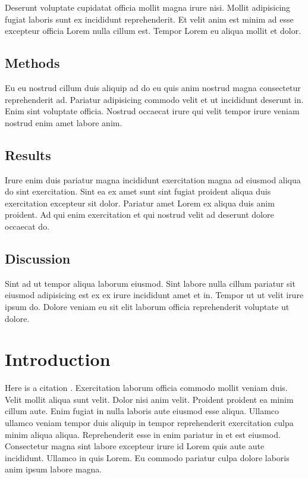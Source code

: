 \documentclass[
  super,
  preprint,
  3p]{elsarticle}
\begin{document}
Deserunt voluptate cupidatat officia mollit magna irure nisi. Mollit
adipisicing fugiat laboris sunt ex incididunt reprehenderit. Et velit
anim est minim ad esse excepteur officia Lorem nulla cillum est. Tempor
Lorem eu aliqua mollit et dolor.

\hypertarget{methods}{%
\subsection{Methods}\label{methods}}

Eu eu nostrud cillum duis aliquip ad do eu quis anim nostrud magna
consectetur reprehenderit ad. Pariatur adipisicing commodo velit et ut
incididunt deserunt in. Enim sint voluptate officia. Nostrud occaecat
irure qui velit tempor irure veniam nostrud enim amet labore anim.

\hypertarget{results}{%
\subsection{Results}\label{results}}

Irure enim duis pariatur magna incididunt exercitation magna ad eiusmod
aliqua do sint exercitation. Sint ea ex amet sunt sint fugiat proident
aliqua duis exercitation excepteur sit dolor. Pariatur amet Lorem ex
aliqua duis anim proident. Ad qui enim exercitation et qui nostrud velit
ad deserunt dolore occaecat do.

\hypertarget{discussion}{%
\subsection{Discussion}\label{discussion}}

Sint ad ut tempor aliqua laborum eiusmod. Sint labore nulla cillum
pariatur sit eiusmod adipisicing est ex ex irure incididunt amet et in.
Tempor ut ut velit irure ipsum do. Dolore veniam eu sit elit laborum
officia reprehenderit voluptate ut dolore.

\newpage{}

\hypertarget{introduction}{%
\section{Introduction}\label{introduction}}

Here is a citation \citep{Marwick2017}. Exercitation laborum officia
commodo mollit veniam duis. Velit mollit aliqua sunt velit. Dolor nisi
anim velit. Proident proident ea minim cillum aute. Enim fugiat in nulla
laboris aute eiusmod esse aliqua. Ullamco ullamco veniam tempor duis
aliquip in tempor reprehenderit exercitation culpa minim aliqua aliqua.
Reprehenderit esse in enim pariatur in et est eiusmod. Consectetur magna
sint labore excepteur irure id Lorem quis aute aute incididunt. Ullamco
in quis Lorem. Eu commodo pariatur culpa dolore laboris anim ipsum
labore magna.
\end{document}
